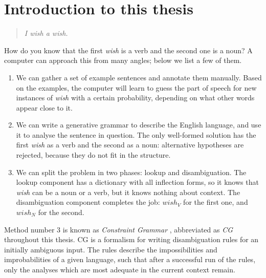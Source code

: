 \chapter{Introduction to this thesis}


\begin{quote}
\emph{I wish a wish.}
\end{quote}

\noindent How do you know that the first \emph{wish} is a verb and the second one is a noun? A computer can approach this from many angles; below we list a few of them.

\begin{enumerate}
\item We can gather a set of example sentences and annotate them manually. %
Based on the examples, the computer will learn to guess the 
part of speech for new instances of \emph{wish} with a certain probability, 
depending on what other words appear close to it.

\item We can write a generative grammar to describe the English language, and use it to analyse the sentence in question.
The only well-formed solution has the first \emph{wish} as a verb and the second as a noun: alternative hypotheses are rejected, 
because they do not fit in the structure.


\item We can split the problem in two phases: lookup and disambiguation.
The lookup component has a dictionary with all inflection forms, so it knows that 
\emph{wish} can be a noun or a verb, but it knows nothing about context.
The disambiguation component completes the job: $wish_V$ for the first one, and $wish_N$ for the second.
\end{enumerate}

Method number 3 is known as \emph{Constraint Grammar} \cite{karlsson1995constraint}, abbreviated as \emph{CG} throughout this thesis. 
CG is a formalism for writing disambiguation rules for an initially ambiguous input. The rules describe the impossibilities and improbabilities of a given language, such that after a successful run of the rules, 
only the analyses which are most adequate in the current context remain.

